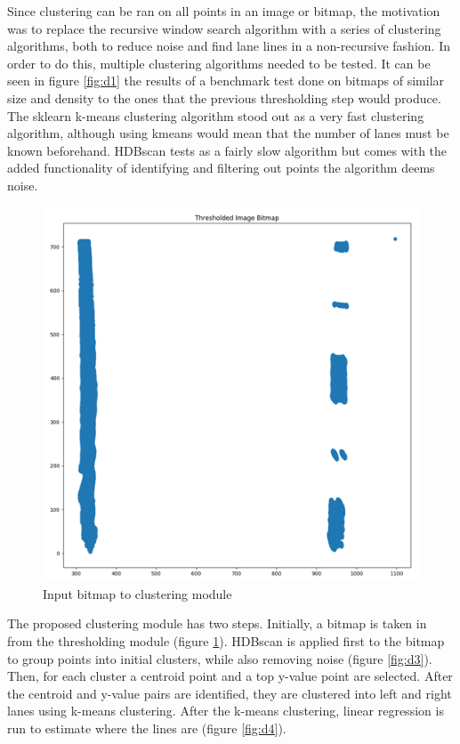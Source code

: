 \documentclass[twoside,twocolumn]{article}
\begin{document}
\par Since clustering can be ran on all points in an image or bitmap, the motivation was to replace the recursive window search algorithm with a series of clustering algorithms, both to reduce noise and find lane lines in a non-recursive fashion. In order to do this, multiple clustering algorithms needed to be tested. It can be seen in figure \ref{fig:d1} the results of a benchmark test done on bitmaps of similar size and density to the ones that the previous thresholding step would produce. The sklearn k-means clustering algorithm stood out as a very fast clustering algorithm, although using kmeans would mean that the number of lanes must be known beforehand. HDBscan tests as a fairly slow algorithm but comes with the added functionality of identifying and filtering out points the algorithm deems noise.

\begin{figure}
  \includegraphics[width=\linewidth]{daniel2.png}
  \caption{Input bitmap to clustering module}
  \label{fig:d2}
\end{figure}

\par The proposed clustering module has two steps. Initially, a bitmap is taken in from the thresholding module (figure \ref{fig:d2}). HDBscan is applied first to the bitmap to group points into initial clusters, while also removing noise (figure \ref{fig:d3}). Then, for each cluster a centroid point and a top y-value point are selected. After the centroid and y-value pairs are identified, they are clustered into left and right lanes using k-means clustering. After the k-means clustering, linear regression is run to estimate where the lines are (figure \ref{fig:d4}).
\end{document}
